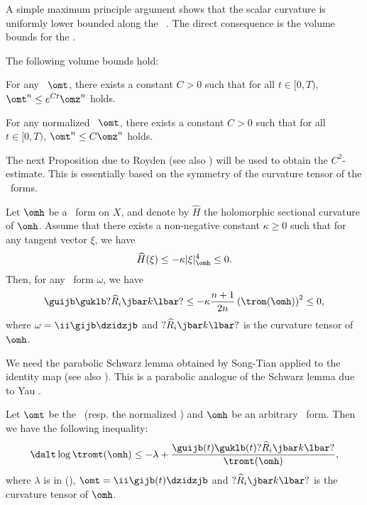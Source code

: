 \documentclass[12pt]{amsart}
\begin{document}
A simple maximum principle argument shows that the scalar curvature  is uniformly lower bounded along the \krf \ \citep[3.2.2]{BEG13IntrotoKRF}.
The direct consequence is the volume bounds for the \krf .

\begin{proposition}\label{volprop}
The following volume bounds hold:
\begin{enua}
	\item For any \krf \ $\omt$, there exists a constant $C>0$ such that for all $t \in [0,T)$, $\omt ^n \le e^{Ct}\omz^n$ holds.
	\item For any normalized \krf \ $\omt$, there exists a constant $C>0$ such that for all $t \in [0,T)$, $\omt ^n \le C \omz^n$ holds.
\end{enua}
\end{proposition}


The next Proposition due to Royden \citep[Lemma]{Royden80} (see also \citep[Lemma 2.1]{WongWuYau12}) will be used to obtain the $C^2$-estimate. 
This is essentially based on the symmetry of the curvature tensor of the \kahler \ forms. 
\begin{proposition}\label{Roydenprop}
Let $\omh$ be a \kahler \ form on $X$, and denote by $\widehat{H} $ the holomorphic sectional curvature of $\omh$. Assume that there exists a non-negative constant $\kappa \ge 0$ such that for any tangent vector $\xi$, we have
\begin{align}\label{holsect}
\widehat{H} (\xi ) \le -\kappa |\xi |_{\omh}^4 \le 0.
\end{align}
Then, for any \kahler \ form $\omega$, we have
\begin{align*}
\guijb \guklb ?{\widehat{R}}_i\jbar k \lbar ? \le -\kappa \dfrac{n+1}{2n} \left( \trom(\omh )\right)^2 \le 0,
\end{align*} 
where $\omega = \ii \gijb \dzidzjb $ and $?{\widehat{R}}_i\jbar k \lbar ? $ is the curvature tensor of $\omh$.
\end{proposition}


We need the parabolic Schwarz lemma obtained by Song-Tian \citep{SongTian07KRFSurfKod} applied to the identity map (see also \citep[3.2.6]{BEG13IntrotoKRF}). This is a parabolic analogue of the Schwarz lemma due to Yau \citep{Yau78Schwarz}. 
\begin{proposition}\label{schwarzprop}
Let $\omt$ be the \krf \ (resp. the normalized \krf) and $\omh$ be an arbitrary \kahler \ form.
Then we have the following inequality:
\begin{align*}
\dalt \log \tromt(\omh ) 
	\le - \lambda
		+ \dfrac{ \guijb (t) \guklb (t) ?{\widehat{R}}_i\jbar k \lbar ? }{ \tromt (\omh ) },
\end{align*}
where $\lambda$ is in (), $\omt = \ii \gijb(t) \dzidzjb $ and $?{\widehat{R}}_i\jbar k \lbar ? $ is the curvature tensor of $\omh$.
\end{proposition}
\end{document}
